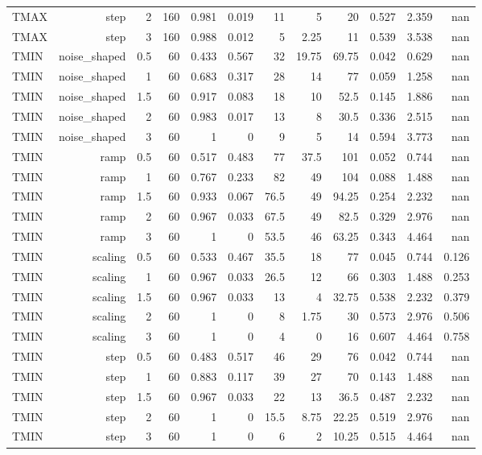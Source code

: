 \documentclass[10pt,a4paper]{article}
\begin{document}
{\begin{longtable}{lrrrrrrrrrrr}
TMAX & step & 2 & 160 & 0.981 & 0.019 & 11 & 5 & 20 & 0.527 & 2.359 & nan \\
TMAX & step & 3 & 160 & 0.988 & 0.012 & 5 & 2.25 & 11 & 0.539 & 3.538 & nan \\
TMIN & noise\_\allowbreak{}shaped & 0.5 & 60 & 0.433 & 0.567 & 32 & 19.75 & 69.75 & 0.042 & 0.629 & nan \\
TMIN & noise\_\allowbreak{}shaped & 1 & 60 & 0.683 & 0.317 & 28 & 14 & 77 & 0.059 & 1.258 & nan \\
TMIN & noise\_\allowbreak{}shaped & 1.5 & 60 & 0.917 & 0.083 & 18 & 10 & 52.5 & 0.145 & 1.886 & nan \\
TMIN & noise\_\allowbreak{}shaped & 2 & 60 & 0.983 & 0.017 & 13 & 8 & 30.5 & 0.336 & 2.515 & nan \\
TMIN & noise\_\allowbreak{}shaped & 3 & 60 & 1 & 0 & 9 & 5 & 14 & 0.594 & 3.773 & nan \\
TMIN & ramp & 0.5 & 60 & 0.517 & 0.483 & 77 & 37.5 & 101 & 0.052 & 0.744 & nan \\
TMIN & ramp & 1 & 60 & 0.767 & 0.233 & 82 & 49 & 104 & 0.088 & 1.488 & nan \\
TMIN & ramp & 1.5 & 60 & 0.933 & 0.067 & 76.5 & 49 & 94.25 & 0.254 & 2.232 & nan \\
TMIN & ramp & 2 & 60 & 0.967 & 0.033 & 67.5 & 49 & 82.5 & 0.329 & 2.976 & nan \\
TMIN & ramp & 3 & 60 & 1 & 0 & 53.5 & 46 & 63.25 & 0.343 & 4.464 & nan \\
TMIN & scaling & 0.5 & 60 & 0.533 & 0.467 & 35.5 & 18 & 77 & 0.045 & 0.744 & 0.126 \\
TMIN & scaling & 1 & 60 & 0.967 & 0.033 & 26.5 & 12 & 66 & 0.303 & 1.488 & 0.253 \\
TMIN & scaling & 1.5 & 60 & 0.967 & 0.033 & 13 & 4 & 32.75 & 0.538 & 2.232 & 0.379 \\
TMIN & scaling & 2 & 60 & 1 & 0 & 8 & 1.75 & 30 & 0.573 & 2.976 & 0.506 \\
TMIN & scaling & 3 & 60 & 1 & 0 & 4 & 0 & 16 & 0.607 & 4.464 & 0.758 \\
TMIN & step & 0.5 & 60 & 0.483 & 0.517 & 46 & 29 & 76 & 0.042 & 0.744 & nan \\
TMIN & step & 1 & 60 & 0.883 & 0.117 & 39 & 27 & 70 & 0.143 & 1.488 & nan \\
TMIN & step & 1.5 & 60 & 0.967 & 0.033 & 22 & 13 & 36.5 & 0.487 & 2.232 & nan \\
TMIN & step & 2 & 60 & 1 & 0 & 15.5 & 8.75 & 22.25 & 0.519 & 2.976 & nan \\
TMIN & step & 3 & 60 & 1 & 0 & 6 & 2 & 10.25 & 0.515 & 4.464 & nan \\
\end{longtable}
}
\end{document}
